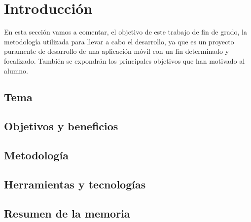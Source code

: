 \section{Introducción}
\setlength{\parskip}{0.5cm}

En esta sección vamos a comentar, el objetivo de este trabajo de fin de grado, la metodología utilizada para llevar a cabo el desarrollo, ya que es un proyecto puramente de desarrollo de una aplicación móvil con un fin determinado y focalizado. También se expondrán los principales objetivos que han motivado al alumno. 

\subsection{Tema}


\subsection{Objetivos y beneficios}


\subsection{Metodología}\label{sec:metodologia}


\subsection{Herramientas y tecnologías}


\subsection{Resumen de la memoria}
